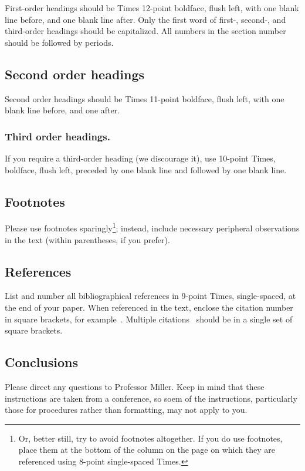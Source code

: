 \documentclass[10pt,twocolumn]{article}
\begin{document}
First-order headings should be Times 12-point boldface, flush left,
with one blank line before, and one blank line after.  Only the first
word of first-, second-, and third-order headings should be
capitalized.  All numbers in the section number should be followed by
periods.

\subsection{Second order headings}

Second order headings should be Times 11-point boldface, flush left,
with one blank line before, and one after.

\subsubsection{Third order headings.}

If you require a third-order heading (we discourage it), use 10-point
Times, boldface, flush left, preceded by one blank line and followed by
one blank line.

\subsection{Footnotes}

Please use footnotes sparingly\footnote{Or, better still, try to avoid
  footnotes altogether.  If you do use footnotes, place them at the
  bottom of the column on the page on which they are referenced using
  8-point single-spaced Times.}; instead, include necessary peripheral
observations in the text (within parentheses, if you prefer).

\subsection{References}

List and number all bibliographical references in 9-point Times,
single-spaced, at the end of your paper. When referenced in the text,
enclose the citation number in square brackets, for
example~\cite{ex1}.  Multiple citations~\cite{ex1,ex2} should be in a
single set of square brackets.

\subsection{Conclusions}

Please direct any questions to Professor Miller.  Keep in mind that
these instructions are taken from a conference, so soem of the
instructions, particularly those for procedures rather than
formatting, may not apply to you.



\end{document}
